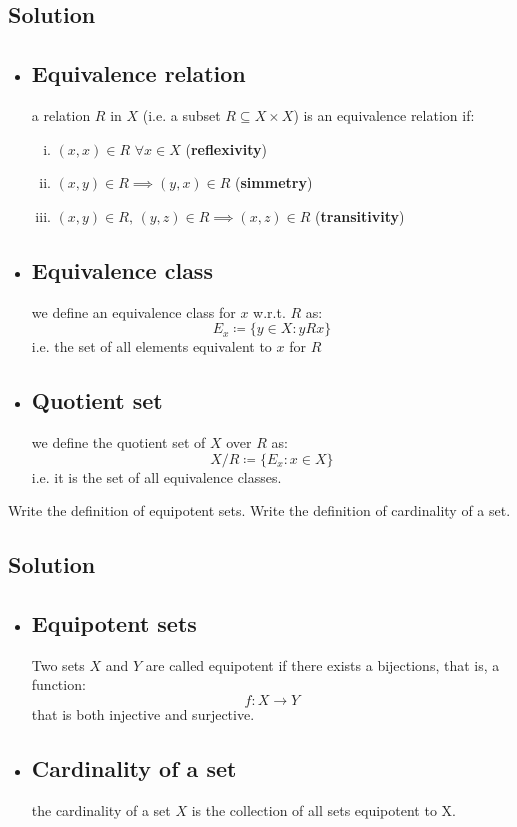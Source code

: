 \subsection*{Solution}
\provdefs
\begin{itemize}
    \item \subsection{Equivalence relation} \label{equivrel} a relation $R$ in $X$ (i.e. a subset $R\subseteq X\times X$) is an equivalence relation if:
    \begin{enumerate}[i)]
        \item $(x,x) \in R$ $\forall x\in X$ (\textbf{reflexivity})
        \item $(x,y) \in R \implies (y,x)\in R$ (\textbf{simmetry})
        \item $(x,y) \in R, \, (y,z)\in R \implies (x,z)\in R$ (\textbf{transitivity})
    \end{enumerate}
    \item \subsection{Equivalence class} we define an equivalence class for $x$ w.r.t. $R$ as:
    \[
        E_x \coloneqq \{y\in X : yRx\}
    \]
    i.e. the set of all elements equivalent to $x$ for $R$
    \item \subsection{Quotient set} we define the quotient set of $X$ over $R$ as:
    \[
        X / R \coloneqq \{E_x: x\in X \}    
    \]
    i.e. it is the set of all equivalence classes.
\end{itemize}


\question
Write the definition of equipotent sets. Write the definition of cardinality of a set.

\subsection*{Solution}
\provdefs
\begin{itemize}
    \item \subsection{Equipotent sets} Two sets $X$ and $Y$ are called equipotent if there exists a bijections, that is, a function:
    \[
        f:X\to Y    
    \]
    that is both injective and surjective.
    \item \subsection{Cardinality of a set} the cardinality of a set $X$ is the collection of all sets equipotent to X.
\end{itemize}


